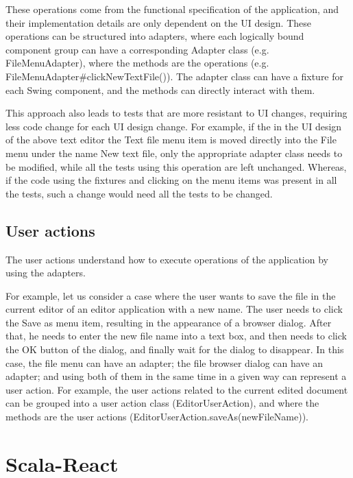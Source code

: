 These operations come from the functional specification of the application, and their implementation details are only dependent on the UI design. These operations can be structured into adapters, where each logically bound component group can have a corresponding Adapter class (e.g. FileMenuAdapter), where the methods are the operations (e.g. FileMenuAdapter\#clickNewTextFile()). The adapter class can have a fixture for each Swing component, and the methods can directly interact with them.

This approach also leads to tests that are more resistant to UI changes, requiring less code change for each UI design change. For example, if the in the UI design of the above text editor the Text file menu item is moved directly into the File menu under the name New text file, only the appropriate adapter class needs to be modified, while all the tests using this operation are left unchanged. Whereas, if the code using the fixtures and clicking on the menu items was present in all the tests, such a change would need all the tests to be changed.

\subsection {User actions}

The user actions understand how to execute operations of the application by using the adapters. 

For example, let us consider a case where the user wants to save the file in the current editor of an editor application with a new name. The user needs to click the Save as menu item, resulting in the appearance of a browser dialog. After that, he needs to enter the new file name into a text box, and then needs to click the OK button of the dialog, and finally wait for the dialog to disappear. In this case, the file menu can have an adapter; the file browser dialog can have an adapter; and using both of them in the same time in a given way can represent a user action. For example, the user actions related to the current edited document can be grouped into a user action class (EditorUserAction), and where the methods are the user actions (EditorUserAction.saveAs(newFileName)).

\section{Scala-React}\label{sec:scala-react}


